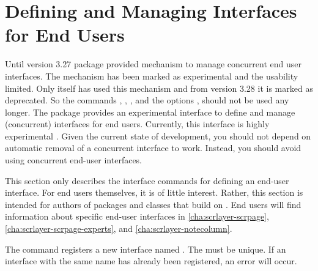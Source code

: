 \section{Defining and Managing Interfaces for End Users}

\iftrue%
Until version 3.27 package
 provided mechanism to manage concurrent end user
interfaces. The mechanism has been marked as experimental and the usability
limited. Only \KOMAScript{} itself has used this mechanism and from version
3.28 it is marked as deprecated. So the commands
,
,
,
%
and the options
,
should not be used any longer.%
\else%
The  package provides an experimental interface to define
and manage (concurrent) interfaces for end users.  Currently, this interface is highly
experimental%
%
. Given the current state of development, you should not depend on automatic
removal of a concurrent interface to work. Instead, you should avoid using
concurrent end-user interfaces.

This section only describes the interface commands for defining an end-user
interface. For end users themselves, it is of little interest. Rather, this
section is intended for authors of packages and classes that build on
. End users will find information about specific end-user
interfaces in \autoref{cha:scrlayer-scrpage},
\autoref{cha:scrlayer-scrpage-experts}, and \autoref{cha:scrlayer-notecolumn}.

\begin{Declaration}
\end{Declaration}
The  command registers a new interface named
. The  must be unique. If an
interface with the same name has already been registered, an error will occur.

